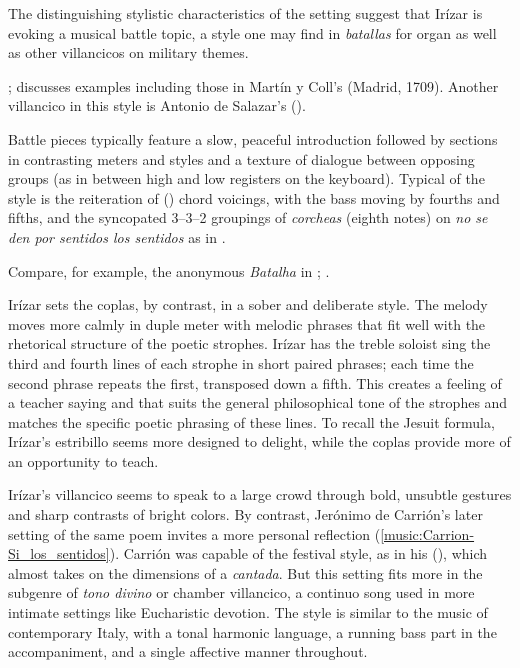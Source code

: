 The distinguishing stylistic characteristics of the setting suggest that Irízar
is evoking a musical battle topic, a style one may find in \emph{batallas} for
organ as well as other villancicos on military themes.%
\begin{Footnote}
    \Autocite[]{Grove}; 
    \autocite{Sutton:IberianBatalla} discusses examples including those in
    Martín y Coll's  (Madrid, 1709).
    Another villancico in this style is Antonio de Salazar's  ().
\end{Footnote}
Battle pieces typically feature a slow, peaceful introduction followed by
sections in contrasting meters and styles and a texture of dialogue between
opposing groups (as in between high and low registers on the keyboard).  
Typical of the style is the reiteration of  () chord voicings, with the bass moving by fourths and fifths, and the
syncopated 3--3--2 groupings of \emph{corcheas} (eighth notes) on \emph{no se
den por sentidos los sentidos} as in .%
\begin{Footnote}
    Compare, for example, the anonymous \emph{Batalha} in ; .  
\end{Footnote}
Irízar sets the coplas, by contrast, in a sober and deliberate style.
The melody moves more calmly in duple meter with melodic phrases that fit well
with the rhetorical structure of the poetic strophes.  
Irízar has the treble soloist sing the third and fourth lines of each strophe in
short paired phrases; each time the second phrase repeats the first, transposed
down a fifth.
This creates a feeling of a teacher saying  and
 that suits the general philosophical tone of the
strophes and matches the specific poetic phrasing of these lines.
To recall the Jesuit formula, Irízar's estribillo seems more designed to
delight, while the coplas provide more of an opportunity to teach.

Irízar's villancico seems to speak to a large crowd through bold, unsubtle
gestures and sharp contrasts of bright colors.
By contrast, Jerónimo de Carrión's later setting of the same poem invites a more
personal reflection (\cref{music:Carrion-Si_los_sentidos}).%
    \Autocite[149--152]{Cashner:WLSCM32}
Carrión was capable of the festival style, as in his  (), which almost takes on the dimensions of a
\emph{cantada}.  
But this setting fits more in the subgenre of \emph{tono divino} or chamber
villancico, a continuo song used in more intimate settings like Eucharistic
devotion.%
    \Autocite[See, for example][]{Robledo:MadridTonos}
The style is similar to the  music of contemporary Italy,
with a tonal harmonic language, a running bass part in the accompaniment, and a
single affective manner throughout.


